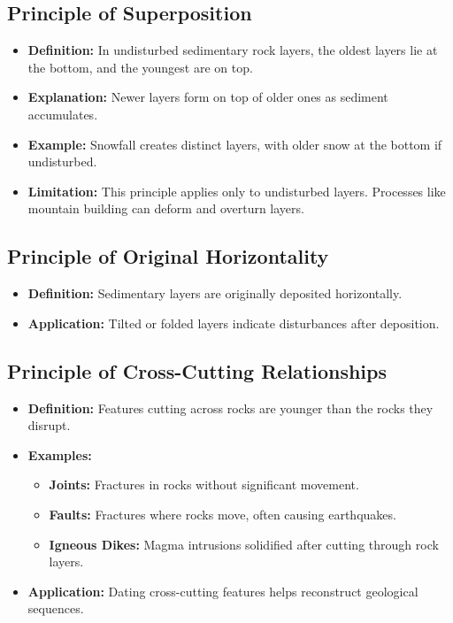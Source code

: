 \documentclass[12pt]{article}
\begin{document}
\subsection*{Principle of Superposition}
\begin{itemize}
    \item \textbf{Definition:} In undisturbed sedimentary rock layers, the oldest layers lie at the bottom, and the youngest are on top.
    \item \textbf{Explanation:} Newer layers form on top of older ones as sediment accumulates.
    \item \textbf{Example:} Snowfall creates distinct layers, with older snow at the bottom if undisturbed.
    \item \textbf{Limitation:} This principle applies only to undisturbed layers. Processes like mountain building can deform and overturn layers.
\end{itemize}

\subsection*{Principle of Original Horizontality}
\begin{itemize}
    \item \textbf{Definition:} Sedimentary layers are originally deposited horizontally.
    \item \textbf{Application:} Tilted or folded layers indicate disturbances after deposition.
\end{itemize}

\subsection*{Principle of Cross-Cutting Relationships}
\begin{itemize}
    \item \textbf{Definition:} Features cutting across rocks are younger than the rocks they disrupt.
    \item \textbf{Examples:}
    \begin{itemize}
        \item \textbf{Joints:} Fractures in rocks without significant movement.
        \item \textbf{Faults:} Fractures where rocks move, often causing earthquakes.
        \item \textbf{Igneous Dikes:} Magma intrusions solidified after cutting through rock layers.
    \end{itemize}
    \item \textbf{Application:} Dating cross-cutting features helps reconstruct geological sequences.
\end{itemize}
\end{document}
